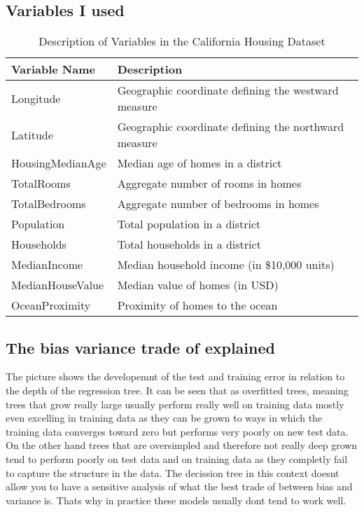 \documentclass[12pt]{article}
\begin{document}
\subsection{Variables I used}
	\begin{table}[ht]
	\centering
	\begin{tabular}{ll}
		\toprule
		\textbf{Variable Name} & \textbf{Description} \\
		\midrule
		Longitude & Geographic coordinate defining the westward measure \\
		Latitude & Geographic coordinate defining the northward measure \\
		HousingMedianAge & Median age of homes in a district \\
		TotalRooms & Aggregate number of rooms in homes \\
		TotalBedrooms & Aggregate number of bedrooms in homes \\
		Population & Total population in a district \\
		Households & Total households in a district \\
		MedianIncome & Median household income (in \$10,000 units) \\
		MedianHouseValue & Median value of homes (in USD) \\
		OceanProximity & Proximity of homes to the ocean \\
		\bottomrule
	\end{tabular}
	\caption{Description of Variables in the California Housing Dataset}
	\label{tab:variables}
\end{table}








\subsection{The bias variance trade of explained}
The picture shows the developemnt of the test and training error in relation to the depth of the regression tree. It can be seen that as overfitted trees, meaning trees that grow really large usually perform really well on training data mostly even excelling in training data as they can be grown to ways in which the training data converges toward zero but performs very poorly on new test data. On the other hand trees that are oversimpled and therefore not really deep grown tend to perform poorly on test data and on training data as they completly fail to capture the structure in the data. The decission tree in this context doesnt allow you to have a sensitive analysis of what the best trade of between bias and variance is. Thats why in practice these models usually dont tend to work well. 
\end{document}
